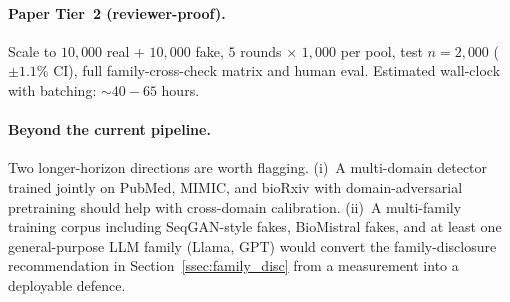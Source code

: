 \paragraph{Paper Tier~2 (reviewer-proof).}
Scale to \(10{,}000\) real + \(10{,}000\) fake, \(5\) rounds $\times$
\(1{,}000\) per pool, test \(n=2{,}000\) (\(\pm 1.1\%\) CI), full
family-cross-check matrix and human eval. Estimated wall-clock with
batching: $\sim$\(40\!-\!65\) hours.

\paragraph{Beyond the current pipeline.}
Two longer-horizon directions are worth flagging. (i)~A multi-domain
detector trained jointly on PubMed, MIMIC, and bioRxiv with
domain-adversarial pretraining \cite{ganin2016dann} should help with
cross-domain calibration. (ii)~A multi-family training corpus including
SeqGAN-style fakes, BioMistral fakes, and at least one general-purpose
LLM family (Llama, GPT) would convert the family-disclosure
recommendation in Section~\ref{ssec:family_disc} from a measurement
into a deployable defence.
